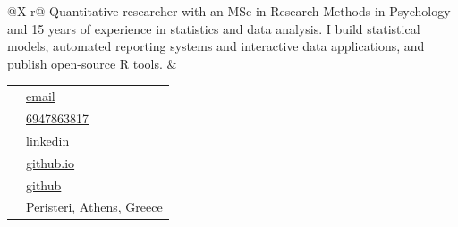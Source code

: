 \documentclass[
  a4paper,
]{article}
\author{}
\date{\vspace{-2.5em}}
\begin{document}


\thispagestyle{empty}

\begin{tcolorbox}[sectionbox, title={\LARGE Dimitrios Zacharatos}]
\begin{tabularx}{\linewidth}{@{}X r@{}}
\small Quantitative researcher with an MSc in Research Methods in Psychology and 15 years of experience in statistics and data analysis. I build statistical models, automated reporting systems and interactive data applications, and publish open-source R tools. &
\begin{tabular}[t]{@{}c@{\,}l@{}}
  \textcolor{accent}{\faEnvelope} & \href{mailto:dzacharatos@yahoo.com}{\small email}\\
  \textcolor{accent}{\faPhone} & \href{tel:00306947863817}{\small 6947863817}\\
  \textcolor{accent}{\faLinkedin} & \href{https://www.linkedin.com/in/dimitrios-zacharatos/}{\small linkedin}\\
  \textcolor{accent}{\faHome} & \href{https://sedzinfo.github.io/}{\small github.io}\\
  \textcolor{accent}{\faGithub} & \href{https://github.com/sedzinfo}{\small github}\\
  \textcolor{accent}{\faMapMarker} & \small Peristeri, Athens, Greece\\
\end{tabular}
\end{tabularx}
\end{tcolorbox}
\end{document}
